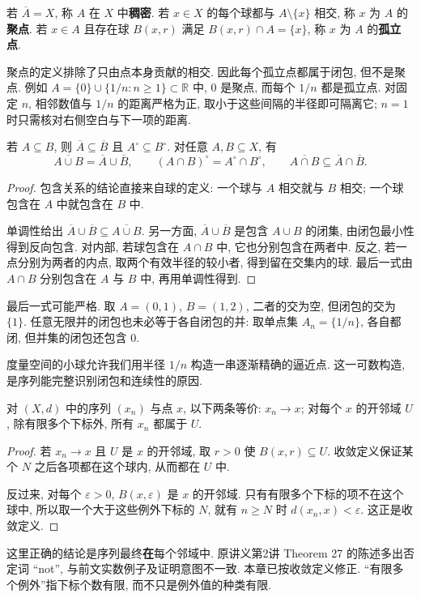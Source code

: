 \begin{definition}[稠密, 聚点与孤立点]
若 $\overline A=X$, 称 $A$ 在 $X$ 中\textbf{稠密}. 若 $x\in X$ 的每个球都与 $A\setminus\{x\}$ 相交, 称 $x$ 为 $A$ 的\textbf{聚点}. 若 $x\in A$ 且存在球 $B(x,r)$ 满足 $B(x,r)\cap A=\{x\}$, 称 $x$ 为 $A$ 的\textbf{孤立点}.
\end{definition}
聚点的定义排除了只由点本身贡献的相交. 因此每个孤立点都属于闭包, 但不是聚点. 例如 $A=\{0\}\cup\{1/n:n\ge1\}\subset\mathbb{R}$ 中, $0$ 是聚点, 而每个 $1/n$ 都是孤立点. 对固定 $n$, 相邻数值与 $1/n$ 的距离严格为正, 取小于这些间隔的半径即可隔离它; $n=1$ 时只需核对右侧空白与下一项的距离.

\begin{proposition}[闭包的集合运算]\label{ch:seq:closure-operations}
若 $A\subseteq B$, 则 $\overline A\subseteq\overline B$ 且 $A^\circ\subseteq B^\circ$. 对任意 $A,B\subseteq X$, 有
\[
 \overline{A\cup B}=\overline A\cup\overline B,
 \qquad
 (A\cap B)^\circ=A^\circ\cap B^\circ,
 \qquad
 \overline{A\cap B}\subseteq\overline A\cap\overline B.
\]
\end{proposition}
\begin{proof}
包含关系的结论直接来自球的定义: 一个球与 $A$ 相交就与 $B$ 相交; 一个球包含在 $A$ 中就包含在 $B$ 中.

单调性给出 $\overline A\cup\overline B\subseteq\overline{A\cup B}$. 另一方面, $\overline A\cup\overline B$ 是包含 $A\cup B$ 的闭集, 由闭包最小性得到反向包含. 对内部, 若球包含在 $A\cap B$ 中, 它也分别包含在两者中. 反之, 若一点分别为两者的内点, 取两个有效半径的较小者, 得到留在交集内的球. 最后一式由 $A\cap B$ 分别包含在 $A$ 与 $B$ 中, 再用单调性得到.
\end{proof}
最后一式可能严格. 取 $A=(0,1)$, $B=(1,2)$, 二者的交为空, 但闭包的交为 $\{1\}$. 任意无限并的闭包也未必等于各自闭包的并: 取单点集 $A_n=\{1/n\}$, 各自都闭, 但并集的闭包还包含 $0$.

\label{ch:seq:sequence-criteria}
度量空间的小球允许我们用半径 $1/n$ 构造一串逐渐精确的逼近点. 这一可数构造, 是序列能完整识别闭包和连续性的原因.

\begin{theorem}[邻域中的最终包含]\label{ch:seq:neighborhood-limit}
对 $(X,d)$ 中的序列 $(x_n)$ 与点 $x$, 以下两条等价: $x_n\to x$; 对每个 $x$ 的开邻域 $U$, 除有限多个下标外, 所有 $x_n$ 都属于 $U$.
\end{theorem}
\begin{proof}
若 $x_n\to x$ 且 $U$ 是 $x$ 的开邻域, 取 $r>0$ 使 $B(x,r)\subseteq U$. 收敛定义保证某个 $N$ 之后各项都在这个球内, 从而都在 $U$ 中.

反过来, 对每个 $\varepsilon>0$, $B(x,\varepsilon)$ 是 $x$ 的开邻域. 只有有限多个下标的项不在这个球中, 所以取一个大于这些例外下标的 $N$, 就有 $n\ge N$ 时 $d(x_n,x)<\varepsilon$. 这正是收敛定义.
\end{proof}
\begin{remark}
这里正确的结论是序列最终\textbf{在}每个邻域中. 原讲义第2讲 Theorem 27 的陈述多出否定词 ``not'', 与前文实数例子及证明意图不一致. 本章已按收敛定义修正. ``有限多个例外''指下标个数有限, 而不只是例外值的种类有限.
\end{remark}

